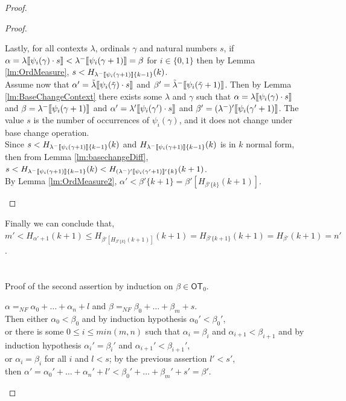 \documentclass{amsart}
\theoremstyle{plain}
\theoremstyle{plain}
\def\scbrl{[\hspace{-.14em}[}
\def\scbrr{]\hspace{-.14em}]}
\def\scbr#1{\scbrl#1\scbrr}
\newcommand\OT{\mathsf{OT}}
\newcommand{\al}{{\alpha}}
\newcommand{\be}{{\beta}}
\newcommand{\ga}{\gamma}
\newcommand{\la}{\lambda}
\def\scbrl{[\hspace{-.14em}[}
\def\scbrr{]\hspace{-.14em}]}
\def\scbr#1{\scbrl#1\scbrr}
\begin{document}
\begin{proof}
\begin{proof}
\begin{Cases}
    
    \item
    Lastly, for all contexts $\la$, ordinals $\ga$ and natural numbers $s$, 
    if $\al=\la\scbr{\psi_i(\ga) \cdot s}< \la^-\scbr{\psi_i(\ga+1)}=\be $  for $i \in\{0,1\}$ then by Lemma \ref{lm:OrdMeasure}, $s<H_{\la^-\scbr{\psi_i(\ga+1)}\{k-1\}}(k)$.
    \medskip\\
    Assume now that $\al'=\tilde{\la}\scbr{\psi_i(\tilde{\ga}) \cdot s }$ and $\be'=\tilde{\la}^-\scbr{\psi_i(\tilde{\ga}+1)}$. Then by Lemma \ref{lm:BaseChangeContext} there exists some $\la$ and $\ga$ such that  $\al= \la\scbr{\psi_i(\ga) \cdot s }$ and $\be=\la^-\scbr{\psi_i(\ga+1)}$
    and $\al' = \la'\scbr{\psi_i(\ga') \cdot s}$ and  $\be'=(\la^-)'\scbr{\psi_i(\ga'+1)}$.
    The value $s$ is the number of occurrences of $\psi_i(\ga)$, and it does not change under base change operation.         
    \medskip\\
    Since $s<H_{\la^-\scbr{\psi_i(\ga+1)}\{k-1\}}(k)$ and $H_{\la^-\scbr{\psi_i(\ga+1)}\{k-1\}}(k)$ is in $k$ normal form, then from Lemma \ref{lm:basechangeDiff}, $s<H_{\la^-\scbr{\psi_i(\ga+1)}\{k-1\}}(k) <H_{(\la^-)'\scbr{\psi_i(\ga'+1)}'\{k\}}(k+1)$.\smallskip
    \\
    By Lemma \ref{lm:OrdMeasure2}, $\al' < \be'\{k+1\}= \be'[H_{\be'\{k\}}(k+1)]$.
\end{Cases}
\end{proof}
Finally we can conclude that,\\
$m'<  H_{\al'+1}(k+1) \leq H_{\be'[H_{\be'\{k\}}(k+1)]}(k+1) = H_{\be'\{k+1\}}(k+1) = H_{\be'}(k+1) = n' $.
\\
\\
\\
Proof of the second assertion by induction on $\be \in \OT_0$.
\begin{Cases}
    \item  $\al =_{NF} \al_0 +\ldots +\al_n +l$  and $\be =_{NF} \be_0 + \ldots + \be_m + s$.\\
    Then either $\al_0<\be_0$ and by induction hypothesis $\al_0'<\be_0'$,\\
    or there is some $0 \leq i \leq min(m,n)$ such that $\al_i=\be_i$  and $\al_{i+1}< \be_{i+1}$ and by induction hypothesis $\al_i'=\be_i'$ and $\al_{i+1}' < \be_{i+1}'$, \\
    or $\al_i=\be_i$ for all $i$ and $l<s$; by the previous assertion $l'<s'$,\\
    then $\al' =\al_0'+\ldots + \al_n'+l' < \be_0'+\ldots+\be_m'+s' =\be'$. 
    

\end{Cases}
\end{proof}
\end{document}

